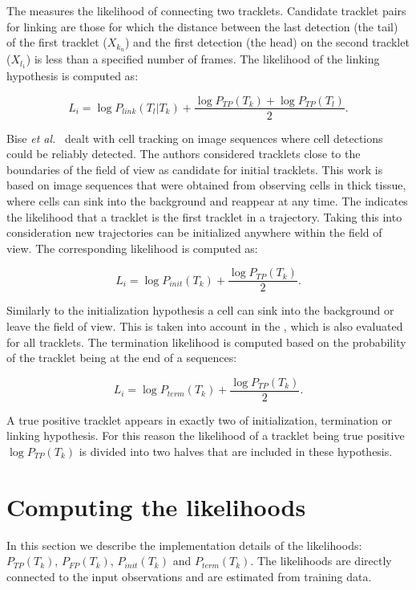 		The  measures the likelihood of connecting two tracklets. Candidate tracklet pairs for linking are those for which the distance between the last detection (the tail) of the first tracklet ($X_{k_n}$)  and the first detection (the head) on the second tracklet ($X_{l_1}$) is less than a specified number of frames. The likelihood of the linking hypothesis is computed as:
		
		\[
			L_i = \log P_{link}(T_l | T_k) + \frac{\log P_{TP}(T_k) + \log P_{TP}(T_l)}{2} \text{.}
		\]
		
		Bise \emph{et al.}~\cite{bise11global} dealt with cell tracking on image sequences where cell detections could be reliably detected. The authors considered tracklets close to the boundaries of the field of view as candidate for initial tracklets. This work is based on image sequences that were obtained from observing cells in thick tissue, where cells can sink into the background and reappear at any time. The  indicates the likelihood that a tracklet is the first tracklet in a trajectory. Taking this into consideration new trajectories can be initialized anywhere within the field of view. The corresponding likelihood is computed as:
		
		\[
			L_i = \log P_{init}(T_k) + \frac{\log P_{TP}(T_k)}{2}\text{.}
		\]
		
			
		Similarly to the initialization hypothesis a cell can sink into the background or leave the field of view. This is taken into account in the , which is also evaluated for all tracklets. The termination likelihood is computed based on the probability of the tracklet being at the end of a sequences:
		
		\[
			L_i = \log P_{term}(T_k) + \frac{\log P_{TP}(T_k)}{2}\text{.}
		\]
		
		A true positive tracklet appears in exactly two of initialization, termination or linking hypothesis. For this reason the likelihood of a tracklet being true positive $\log P_{TP}(T_k)$ is divided into two halves that are included in these hypothesis.
       	
    \section{Computing the likelihoods \statusfirstdraft}
       	\label{sec:computinglikelihoods}
       	
       	In this section we describe the implementation details of the likelihoods: $P_{TP}(T_k)$, $P_{FP}(T_k)$, $P_{init}(T_k)$ and $P_{term}(T_k)$. The likelihoods are directly connected to the input observations and are estimated from training data.     			

